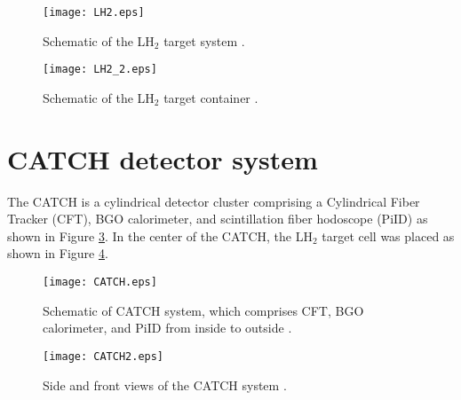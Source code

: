 \begin{figure}[!h]
 \begin{center}
   \texttt{[image: LH2.eps]}
   \caption{Schematic of the LH$_{2}$ target system \cite{Nana-D}.}
   \label{fig-LH2}
 \end{center}
\end{figure}

\begin{figure}[!h]
 \begin{center}
   \texttt{[image: LH2\_2.eps]}
   \caption{Schematic of the LH$_{2}$ target container \cite{Nana-D}.}
   \label{fig-LH2_2}
 \end{center}
\end{figure}

\clearpage
\section{CATCH detector system}
The CATCH is a cylindrical detector cluster comprising a Cylindrical Fiber Tracker (CFT), BGO calorimeter, and scintillation fiber hodoscope (PiID) as shown in Figure \ref{fig-CATCH}. In the center of the CATCH, the LH$_2$ target cell was placed as shown in Figure \ref{fig-CATCH2}. 

\begin{figure}[!h]
 \begin{center}
   \texttt{[image: CATCH.eps]}
   \caption{Schematic of CATCH system, which comprises CFT, BGO calorimeter, and PiID from inside to outside \cite{Aka-2020}.}
   \label{fig-CATCH}
 \end{center}
\end{figure}

\begin{figure}[!h]
 \begin{center}
   \texttt{[image: CATCH2.eps]}
   \caption{Side and front views of the CATCH system \cite{Aka-2020}.}
   \label{fig-CATCH2}
 \end{center}
\end{figure}

%
